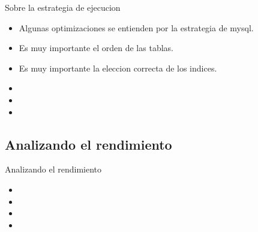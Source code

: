 \begin{frame}{Sobre la estrategia de ejecucion}
  \begin{itemize}
    \item Algunas optimizaciones se entienden por la estrategia de mysql.
    \item Es muy importante el orden de las tablas.
    \item Es muy importante la eleccion correcta de los indices.
    \item 
    \item 
    \item 
  \end{itemize}
\end{frame}

\subsection{Analizando el rendimiento}
\begin{frame}{Analizando el rendimiento}
  \begin{itemize}
    \item 
    \item 
    \item 
    \item 
  \end{itemize}
\end{frame}
